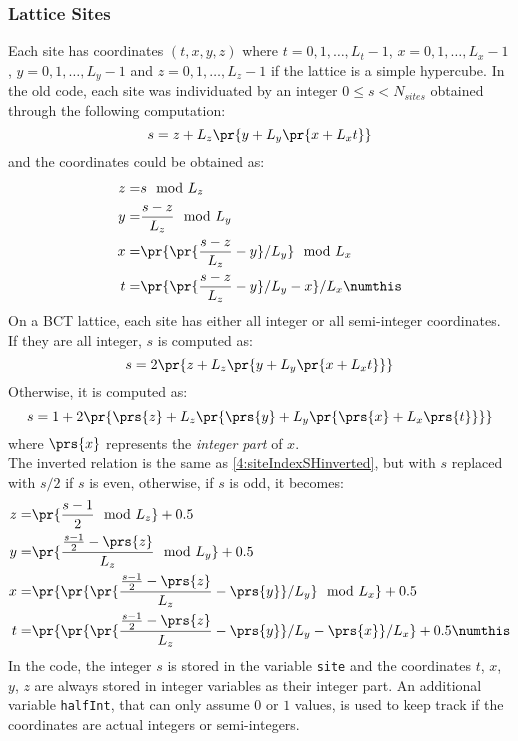 \subsubsection{Lattice Sites}
Each site has coordinates $(t,x,y,z)$ where $t = 0, 1, \dots, L_t-1$, $x = 0, 1, \dots, L_x-1$, $y = 0, 1, \dots, L_y-1$ and $z = 0, 1, \dots, L_z-1$ if the lattice is a simple hypercube.
In the old code, each site was individuated by an integer $0 \leq s < N_{sites}$ obtained through the following computation:
\begin{equation}
    s = z + L_z\pr{y + L_y\pr{x + L_xt}} \label{4:siteIndexSH}
\end{equation}
and the coordinates could be obtained as:
\begin{align*}
    z =& s \mod L_z \\
    y =& \frac{s - z}{L_z} \mod L_y \\
    x =& \pr{\pr{\frac{s - z}{L_z} - y}/L_y} \mod L_x \\
    t =& \pr{\pr{\frac{s - z}{L_z} - y}/L_y - x}/L_x \numthis\label{4:siteIndexSHinverted}
\end{align*}
On a BCT lattice, each site has either all integer or all semi-integer coordinates.\\
If they are all integer, $s$ is computed as:
\begin{equation}
    s = 2\pr{z + L_z\pr{y + L_y\pr{x + L_xt}}} \label{4:siteIndexBCTeven}
\end{equation}
Otherwise, it is computed as:
\begin{equation}
    s = 1 + 2\pr{\prs{z} + L_z\pr{\prs{y} + L_y\pr{\prs{x} + L_x\prs{t}}}} \label{4:siteIndexBCTodd}
\end{equation}
where $\prs{x}$ represents the \emph{integer part} of $x$.\\
The inverted relation is the same as \eqref{4:siteIndexSHinverted}, but with $s$ replaced with $s/2$ if $s$ is even, otherwise, if $s$ is odd, it becomes:
\begin{align*}
    z =& \pr{\frac{s-1}{2} \mod L_z} + 0.5 \\
    y =& \pr{\frac{\frac{s-1}{2} - \prs{z}}{L_z} \mod L_y} + 0.5 \\
    x =& \pr{\pr{\pr{\frac{\frac{s-1}{2} - \prs{z}}{L_z} - \prs{y}}/L_y} \mod L_x} + 0.5 \\
    t =& \pr{\pr{\pr{\frac{\frac{s-1}{2} - \prs{z}}{L_z} - \prs{y}}/L_y - \prs{x}}/L_x} + 0.5 \numthis\label{4:siteIndexBCToddInverted}
\end{align*}
In the code, the integer $s$ is stored in the variable \texttt{site} and the coordinates $t$, $x$, $y$, $z$ are always stored in integer variables as their integer part.
An additional variable \texttt{halfInt}, that can only assume $0$ or $1$ values, is used to keep track if the coordinates are actual integers or semi-integers.


